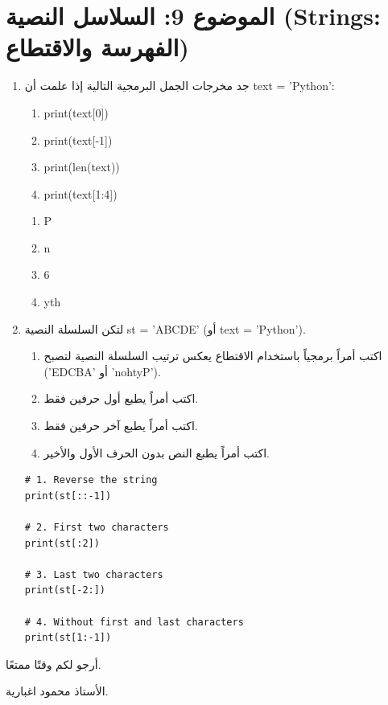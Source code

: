 \documentclass[14pt]{extarticle}
\begin{document}
\section*{الموضوع 9: السلاسل النصية (\textenglish{Strings}: الفهرسة والاقتطاع)}
\begin{enumerate}[itemsep=3em]

\item
جد مخرجات الجمل البرمجية التالية إذا علمت أن \textenglish{text = 'Python'}:
\begin{enumerate}[label=\arabic*)]
    \item \textenglish{print(text[0])}
    \item \textenglish{print(text[-1])}
    \item \textenglish{print(len(text))}
    \item \textenglish{print(text[1:4])}
\end{enumerate}

\ifwithsols
\begin{boxSolution}
\begin{enumerate}[label=\arabic*)]
    \item P
    \item n
    \item 6
    \item yth
\end{enumerate}
\end{boxSolution}
\fi

\item
لتكن السلسلة النصية \textenglish{st = 'ABCDE'} (أو \textenglish{text = 'Python'}).
\begin{enumerate}
    \item اكتب أمراً برمجياً باستخدام الاقتطاع يعكس ترتيب السلسلة النصية لتصبح (\textenglish{'EDCBA'} أو \textenglish{'nohtyP'}).
    \item اكتب أمراً يطبع أول حرفين فقط.
    \item اكتب أمراً يطبع آخر حرفين فقط.
    \item اكتب أمراً يطبع النص بدون الحرف الأول والأخير.
\end{enumerate}

\ifwithsols
\begin{boxSolution}
\begin{english}
\begin{verbatim}
# 1. Reverse the string
print(st[::-1])

# 2. First two characters
print(st[:2])

# 3. Last two characters
print(st[-2:])

# 4. Without first and last characters
print(st[1:-1])
\end{verbatim}
\end{english}
\end{boxSolution}
\fi

\end{enumerate}

\vspace{1cm}
\begin{flushleft}
أرجو لكم وقتًا ممتعًا.

الأستاذ محمود اغبارية.
\end{flushleft}
\end{document}
